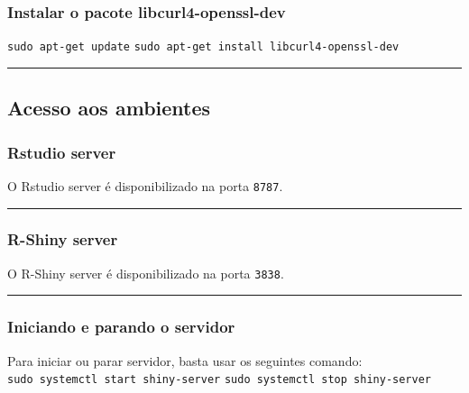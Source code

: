 \documentclass[
]{article}
\begin{document}
\hypertarget{instalar-o-pacote-libcurl4-openssl-dev}{%
\subsubsection{Instalar o pacote
libcurl4-openssl-dev}\label{instalar-o-pacote-libcurl4-openssl-dev}}

\texttt{sudo\ apt-get\ update}
\texttt{sudo\ apt-get\ install\ libcurl4-openssl-dev}

\begin{center}\rule{0.5\linewidth}{0.5pt}\end{center}

\hypertarget{acesso-aos-ambientes}{%
\subsection{Acesso aos ambientes}\label{acesso-aos-ambientes}}

\hypertarget{rstudio-server}{%
\subsubsection{Rstudio server}\label{rstudio-server}}

O Rstudio server é disponibilizado na porta \texttt{8787}.

\begin{center}\rule{0.5\linewidth}{0.5pt}\end{center}

\hypertarget{r-shiny-server}{%
\subsubsection{R-Shiny server}\label{r-shiny-server}}

O R-Shiny server é disponibilizado na porta \texttt{3838}.

\begin{center}\rule{0.5\linewidth}{0.5pt}\end{center}

\hypertarget{iniciando-e-parando-o-servidor}{%
\subsubsection{Iniciando e parando o
servidor}\label{iniciando-e-parando-o-servidor}}

Para iniciar ou parar servidor, basta usar os seguintes comando:\\
\texttt{sudo\ systemctl\ start\ shiny-server}
\texttt{sudo\ systemctl\ stop\ shiny-server}
\end{document}
